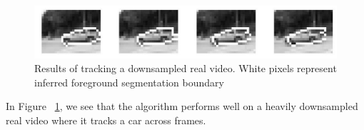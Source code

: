 \begin{figure}[t]
\begin{center}
	\includegraphics[scale=0.35]{figures/car_tracking.jpg}
	\caption{Results of tracking a downsampled real video. White pixels represent inferred foreground segmentation boundary}
	\label{fig:trackCar}
\end{center}
\end{figure}


In Figure ~\ref{fig:trackCar}, we see that the algorithm performs well on a heavily downsampled real video where it tracks a car across frames.